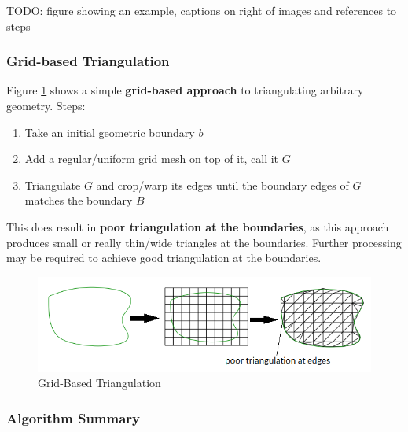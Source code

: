 \documentclass{article}
\begin{document}
TODO: figure showing an example, captions on right of images and references to steps

\subsubsection{Grid-based Triangulation}

Figure \ref{fig:grid-based-triangulation} shows a simple \textbf{grid-based approach} to triangulating arbitrary geometry. Steps:
\begin{enumerate}
	\item Take an initial geometric boundary $b$
	\item Add a regular/uniform grid mesh on top of it, call it $G$
	\item Triangulate $G$ and crop/warp its edges until the boundary edges of $G$ matches the boundary $B$
\end{enumerate}
This does result in \textbf{poor triangulation at the boundaries}, as this approach produces small or really thin/wide triangles at the boundaries. Further processing may be required to achieve good triangulation at the boundaries.

\begin{figure}
	\centering
	\includegraphics[scale=0.6]{figures/grid-based-triangulation.png}
	\caption{Grid-Based Triangulation}
	\label{fig:grid-based-triangulation}
\end{figure}

\subsubsection{Algorithm Summary}
\end{document}
